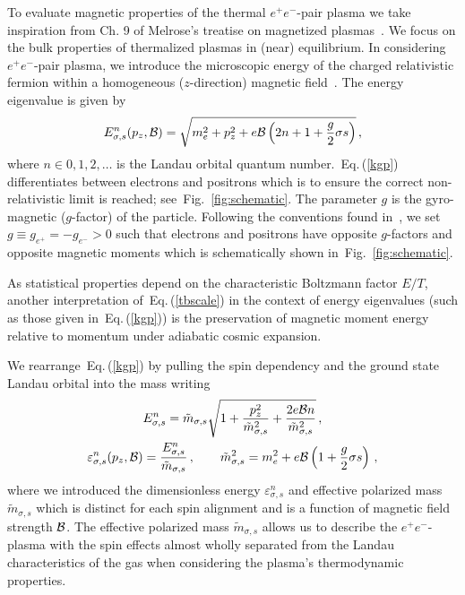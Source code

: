 \documentclass[aps,prd,floatfix,reprint]{revtex4-2}
\newcommand{\req}[1]{Eq.\,(\ref{#1})}
\newcommand{\rf}[1]{Fig.~{\ref{#1}}}
\begin{document}
To evaluate magnetic properties of the thermal $e^{+}e^{-}$-pair plasma we take inspiration from Ch. 9 of Melrose's treatise on magnetized plasmas~\cite{melrose2008quantum}. We focus on the bulk properties of thermalized plasmas in (near) equilibrium. In considering $e^{+}e^{-}$-pair plasma, we introduce the microscopic energy of the charged relativistic fermion within a homogeneous ($z$-direction) magnetic field~\cite{Steinmetz:2018ryf}. The energy eigenvalue is given by
\begin{align}
 \label{kgp}
 E^{n}_{\sigma,s}(p_{z},{\cal B})=\sqrt{m_{e}^{2}+p_{z}^{2}+e{\cal B}\left(2n+1+\frac{g}{2}\sigma s\right)}\,,
\end{align}
where $n\in0,1,2,\ldots$ is the Landau orbital quantum number.~\req{kgp} differentiates between electrons and positrons which is to ensure the correct non-relativistic limit is reached; see~\rf{fig:schematic}. The parameter $g$ is the gyro-magnetic ($g$-factor) of the particle. Following the conventions found in~\cite{Tiesinga:2021myr}, we set $g\equiv g_{e^{+}}=-g_{e^{-}}>0$ such that electrons and positrons have opposite $g$-factors and opposite magnetic moments which is schematically shown in~\rf{fig:schematic}.

As statistical properties depend on the characteristic Boltzmann factor $E/T$, another interpretation of~\req{tbscale} in the context of energy eigenvalues (such as those given in~\req{kgp}) is the preservation of magnetic moment energy relative to momentum under adiabatic cosmic expansion.

We rearrange~\req{kgp} by pulling the spin dependency and the ground state Landau orbital into the mass writing
\begin{gather}
 \label{effmass:1}
 E^{n}_{\sigma,s}={\tilde m}_{\sigma,s}\sqrt{1+\frac{p_{z}^{2}}{{\tilde m}_{\sigma,s}^{2}}+\frac{2e{\cal B}n}{{\tilde m}_{\sigma,s}^{2}}}\,,\\
 \label{effmass:2}
 \varepsilon_{\sigma,s}^{n}(p_{z},{\cal B})=\frac{E_{\sigma,s}^{n}}{{\tilde m}_{\sigma,s}}\,,\qquad{\tilde m}_{\sigma,s}^{2}=m_{e}^{2}+e{\cal B}\left(1+\frac{g}{2}\sigma s\right)\,,
\end{gather}
where we introduced the dimensionless energy $\varepsilon^{n}_{\sigma,s}$ and effective polarized mass ${\tilde m}_{\sigma,s}$ which is distinct for each spin alignment and is a function of magnetic field strength ${\cal B}$. The effective polarized mass ${\tilde m}_{\sigma,s}$ allows us to describe the $e^{+}e^{-}$-plasma with the spin effects almost wholly separated from the Landau characteristics of the gas when considering the plasma's thermodynamic properties.
\end{document}
